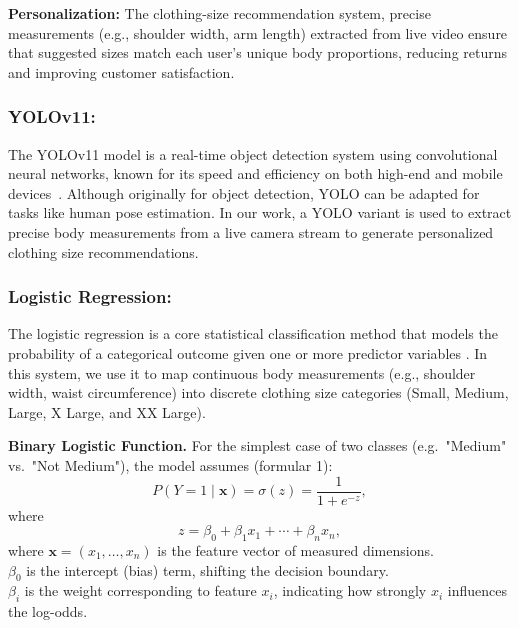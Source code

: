 \documentclass{llncs}
\begin{document}
\medskip

\textbf{Personalization:} The clothing-size recommendation system, precise measurements (e.g., shoulder width, arm length) extracted from live video ensure that suggested sizes match each user's unique body proportions, reducing returns and improving customer satisfaction.


\subsubsection{YOLOv11: } The YOLOv11 model is a real-time object detection system using convolutional neural networks, known for its speed and efficiency on both high-end and mobile devices~\cite{ref5}. Although originally for object detection, YOLO can be adapted for tasks like human pose estimation. In our work, a YOLO variant is used to extract precise body measurements from a live camera stream to generate personalized clothing size recommendations.

\subsubsection{Logistic Regression:} The logistic regression is a core statistical classification method that models the probability of a categorical outcome given one or more predictor variables \cite{ref7}. 
In this system, we use it to map continuous body measurements (e.g., shoulder width, waist circumference) 
into discrete clothing size categories (Small, Medium, Large, X Large, and XX Large).

\textbf{Binary Logistic Function.} For the simplest case of two classes (e.g.\ "Medium" vs.\ "Not Medium"), the model assumes (formular 1):
\begin{equation}
P(Y = 1 \mid \mathbf{x}) = \sigma(z) = \frac{1}{1 + e^{-z}},
\end{equation}
where
\begin{equation}
z = \beta_{0} + \beta_{1} x_{1} + \cdots + \beta_{n} x_{n},
\end{equation}
where
$\mathbf{x} = (x_{1},\ldots,x_{n})$ is the feature vector of measured dimensions. \\

$\beta_{0}$ is the intercept (bias) term, shifting the decision boundary. \\

$\beta_{i}$ is the weight corresponding to feature $x_{i}$, indicating how strongly $x_i$ influences the log-odds. \\
\end{document}
